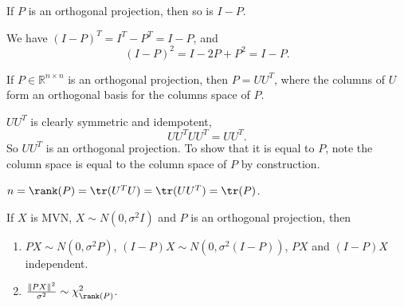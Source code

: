 \documentclass[12pt]{article}
\begin{document}
\begin{corollary}
	If $P$ is an orthogonal projection, then so is $I-P$.
\end{corollary}

\begin{proofbox}
	We have $(I-P)^{T} = I^{T} - P^{T} = I - P$, and
	\[
		(I-P)^2 = I - 2P + P^2 = I - P.
	\]
\end{proofbox}

\begin{proposition}
	If $P \in \mathbb{R}^{n \times n}$ is an orthogonal projection, then $P = UU^{T}$, where the columns of $U$ form an orthogonal basis for the columns space of $P$.
\end{proposition}

\begin{proposition}
	$UU^{T}$ is clearly symmetric and idempotent,
	\[
	UU^{T}U U^{T} = UU^{T}.
	\]
	So $UU^{T}$ is an orthogonal projection. To show that it is equal to $P$, note the column space is equal to the column space of $P$ by construction.
\end{proposition}

\begin{corollary}
	$n = \rank(P) = \tr(U^{T}U) = \tr(UU^{T}) = \tr(P)$.
\end{corollary}

\begin{theorem}
	If $X$ is MVN, $X \sim N(0, \sigma^2 I)$ and $P$ is an orthogonal projection, then
	\begin{enumerate}[\normalfont1.]
		\item $PX \sim N(0, \sigma^2 P)$, $(I-P)X \sim N(0, \sigma^2(I-P))$, $PX$ and $(I-P)X$ independent.
		\item $\frac{\|PX\|^2}{\sigma^2} \sim \chi_{\rank(P)}^2$.
	\end{enumerate}
\end{theorem}
\end{document}
